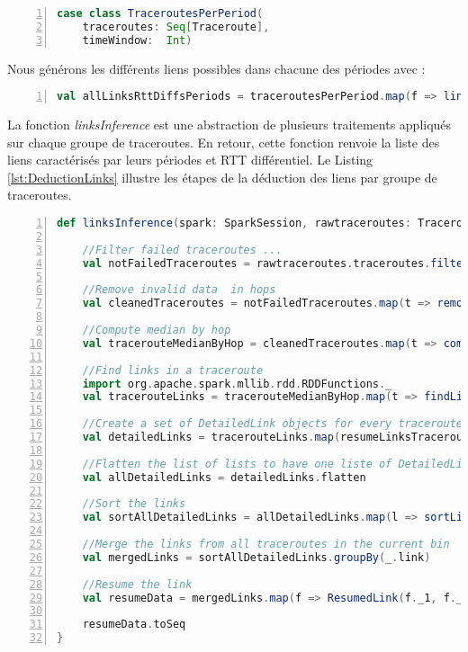 \begin{lstlisting}[language=scala,firstnumber=1, caption={La classe TracerouteWithTimewindow },label={lst:classTraceroutesPerPeriod}, basicstyle = \small,escapechar=|,numbers=left,
stepnumber=1]
case class TraceroutesPerPeriod(
	traceroutes: Seq[Traceroute],
	timeWindow:  Int)
\end{lstlisting}


Nous générons les différents liens possibles dans chacune des périodes avec :

\begin{lstlisting}[language=scala,firstnumber=1, caption={La classe TracerouteWithTimewindow },label={lst:classTraceroutesPerPeriod}, basicstyle = \small,escapechar=|,numbers=left,
stepnumber=1]
val allLinksRttDiffsPeriods = traceroutesPerPeriod.map(f => linksInference(spark, f))
\end{lstlisting}

La fonction \textit{linksInference} est une abstraction de plusieurs traitements appliqués sur chaque groupe de traceroutes. En retour, cette fonction renvoie
la liste des liens caractérisés par leurs périodes et RTT différentiel. Le Listing \ref{lst:DeductionLinks}
illustre les étapes de la déduction des liens par groupe de traceroutes. 

\begin{lstlisting}[language=scala,firstnumber=1, caption={Deduction des liens par groupe de traceroutes},label={lst:DeductionLinks}, basicstyle = \footnotesize,escapechar=|,numbers=left,
stepnumber=1]
 def linksInference(spark: SparkSession, rawtraceroutes: TraceroutesPerPeriod): Seq[ResumedLink] = {
	
	//Filter failed traceroutes ... 
	val notFailedTraceroutes = rawtraceroutes.traceroutes.filter(t => t.result(0).result != null)
	
	//Remove invalid data  in hops
	val cleanedTraceroutes = notFailedTraceroutes.map(t => removeNegative(t))
	
	//Compute median by hop
	val tracerouteMedianByHop = cleanedTraceroutes.map(t => computeMedianRTTByhop(t))
	
	//Find links in a traceroute
	import org.apache.spark.mllib.rdd.RDDFunctions._
	val tracerouteLinks = tracerouteMedianByHop.map(t => findLinksByTraceroute(spark, t))
	
	//Create a set of DetailedLink objects for every traceroute
	val detailedLinks = tracerouteLinks.map(resumeLinksTraceroute)
	
	//Flatten the list of lists to have one liste of DetailedLink objects
	val allDetailedLinks = detailedLinks.flatten
	
	//Sort the links
	val sortAllDetailedLinks = allDetailedLinks.map(l => sortLinks(l))
	
	//Merge the links from all traceroutes in the current bin
	val mergedLinks = sortAllDetailedLinks.groupBy(_.link)
	
	//Resume the link 
	val resumeData = mergedLinks.map(f => ResumedLink(f._1, f._2.map(_.probe), f._2.map(_.rttDiff), generateDatesSample(f._2.size, rawtraceroutes.timeWindow)))
	
	resumeData.toSeq    
}
\end{lstlisting}

